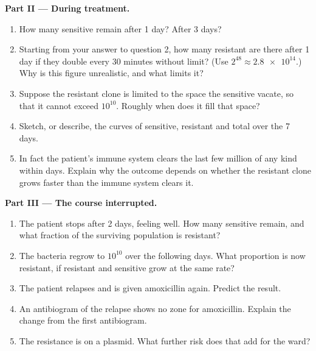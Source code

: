 \begin{problem}
\medskip
\noindent\textbf{Part II --- During treatment.}
\begin{enumerate}[resume]
  \item How many sensitive  remain after 1 day? After 3 days?
  \item Starting from your answer to question 2, how many resistant
         are there after 1 day if they double every 30 minutes
        without limit? (Use $2^{48} \approx \num{2.8e14}$.) Why is
        this figure unrealistic, and what limits it?
  \item Suppose the resistant clone is limited to the space the
        sensitive  vacate, so that it cannot exceed $10^{10}$.
        Roughly when does it fill that space?
  \item Sketch, or describe, the curves of sensitive, resistant and
        total  over the 7 days.
  \item In fact the patient's immune system clears the last few
        million  of any kind within days. Explain why the
        outcome depends on whether the resistant clone grows faster
        than the immune system clears it.
\end{enumerate}

\medskip
\noindent\textbf{Part III --- The course interrupted.}
\begin{enumerate}[resume]
  \item The patient stops after 2 days, feeling well. How many
        sensitive  remain, and what fraction of the surviving
        population is resistant?
  \item The bacteria regrow to $10^{10}$ over the following days.
        What proportion is now resistant, if resistant and sensitive
         grow at the same rate?
  \item The patient relapses and is given amoxicillin again. Predict
        the result.
  \item An antibiogram of the relapse shows no zone for amoxicillin.
        Explain the change from the first antibiogram.
  \item The resistance  is on a plasmid. What further risk does
        that add for the ward?
\end{enumerate}


\end{problem}
